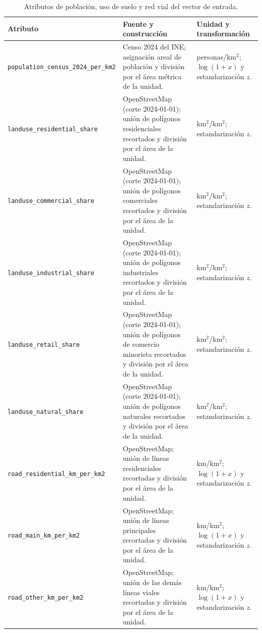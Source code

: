 \begin{table}[H]
  \centering
  \scriptsize
  \caption{Atributos de población, uso de suelo y red vial del vector de entrada.}
  \label{tab:anexo_atributos_base}
  \begin{tabularx}{\textwidth}{@{}p{}p{}X@{}}
    \toprule
    \textbf{Atributo} & \textbf{Fuente y construcción} & \textbf{Unidad y transformación} \\
    \midrule
    \texttt{population\_census\_2024\_per\_km2} &
    Censo 2024 del INE; asignación areal de población y división por el área métrica de la unidad. &
    personas/km$^2$; $\log(1+x)$ y estandarización $z$. \\
    \texttt{landuse\_residential\_share} &
    OpenStreetMap (corte 2024-01-01); unión de polígonos residenciales recortados y división por el área de la unidad. &
    km$^2$/km$^2$; estandarización $z$. \\
    \texttt{landuse\_commercial\_share} &
    OpenStreetMap (corte 2024-01-01); unión de polígonos comerciales recortados y división por el área de la unidad. &
    km$^2$/km$^2$; estandarización $z$. \\
    \texttt{landuse\_industrial\_share} &
    OpenStreetMap (corte 2024-01-01); unión de polígonos industriales recortados y división por el área de la unidad. &
    km$^2$/km$^2$; estandarización $z$. \\
    \texttt{landuse\_retail\_share} &
    OpenStreetMap (corte 2024-01-01); unión de polígonos de comercio minorista recortados y división por el área de la unidad. &
    km$^2$/km$^2$; estandarización $z$. \\
    \texttt{landuse\_natural\_share} &
    OpenStreetMap (corte 2024-01-01); unión de polígonos naturales recortados y división por el área de la unidad. &
    km$^2$/km$^2$; estandarización $z$. \\
    \texttt{road\_residential\_km\_per\_km2} &
    OpenStreetMap; unión de líneas residenciales recortadas y división por el área de la unidad. &
    km/km$^2$; $\log(1+x)$ y estandarización $z$. \\
    \texttt{road\_main\_km\_per\_km2} &
    OpenStreetMap; unión de líneas principales recortadas y división por el área de la unidad. &
    km/km$^2$; $\log(1+x)$ y estandarización $z$. \\
    \texttt{road\_other\_km\_per\_km2} &
    OpenStreetMap; unión de las demás líneas viales recortadas y división por el área de la unidad. &
    km/km$^2$; $\log(1+x)$ y estandarización $z$. \\
    \bottomrule
  \end{tabularx}
\end{table}

